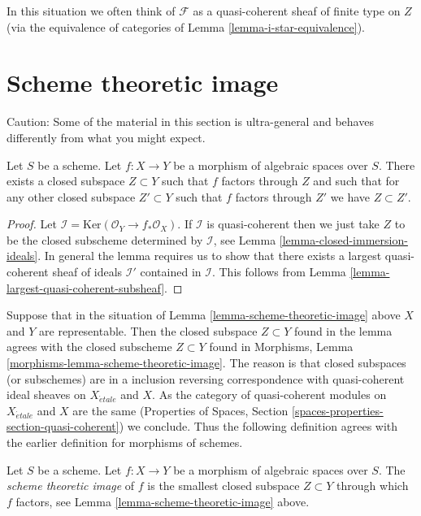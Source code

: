 \noindent
In this situation we often think of $\mathcal{F}$ as a quasi-coherent
sheaf of finite type on $Z$ (via the equivalence of categories of
Lemma \ref{lemma-i-star-equivalence}).






\section{Scheme theoretic image}
\label{section-scheme-theoretic-image}

\noindent
Caution: Some of the material in this section is ultra-general and
behaves differently from what you might expect.

\begin{lemma}
\label{lemma-scheme-theoretic-image}
Let $S$ be a scheme. Let $f : X \to Y$ be a morphism of algebraic spaces
over $S$. There exists a closed subspace $Z \subset Y$ such that $f$ factors
through $Z$ and such that for any other closed subspace $Z' \subset Y$
such that $f$ factors through $Z'$ we have $Z \subset Z'$.
\end{lemma}

\begin{proof}
Let $\mathcal{I} = \text{Ker}(\mathcal{O}_Y \to f_*\mathcal{O}_X)$.
If $\mathcal{I}$ is quasi-coherent then we just take $Z$ to be the
closed subscheme determined by $\mathcal{I}$, see
Lemma \ref{lemma-closed-immersion-ideals}.
In general the lemma requires us to show that there exists
a largest quasi-coherent sheaf of ideals $\mathcal{I}'$ contained in
$\mathcal{I}$.
This follows from Lemma \ref{lemma-largest-quasi-coherent-subsheaf}.
\end{proof}

\noindent
Suppose that in the situation of Lemma \ref{lemma-scheme-theoretic-image}
above $X$ and $Y$ are representable. Then the closed subspace $Z \subset Y$
found in the lemma agrees with the closed subscheme $Z \subset Y$ found in
Morphisms, Lemma \ref{morphisms-lemma-scheme-theoretic-image}.
The reason is that closed subspaces (or subschemes) are in a inclusion
reversing correspondence with quasi-coherent ideal sheaves on
$X_{\acute{e}tale}$ and $X$. As the category of quasi-coherent modules
on $X_{\acute{e}tale}$ and $X$ are the same
(Properties of Spaces, Section \ref{spaces-properties-section-quasi-coherent})
we conclude. Thus the following definition agrees with the earlier
definition for morphisms of schemes.

\begin{definition}
\label{definition-scheme-theoretic-image}
Let $S$ be a scheme. Let $f : X \to Y$ be a morphism of algebraic spaces
over $S$. The {\it scheme theoretic image} of $f$ is the smallest closed
subspace $Z \subset Y$ through which $f$
factors, see Lemma \ref{lemma-scheme-theoretic-image} above.
\end{definition}

